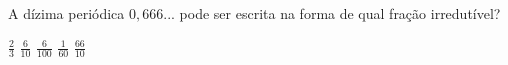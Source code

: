 A dízima periódica $0{,}666...$ pode ser escrita na forma de qual fração irredutível?

$\frac{2}{3}$
$\frac{6}{10}$
$\frac{6}{100}$
$\frac{1}{60}$
$\frac{66}{10}$



